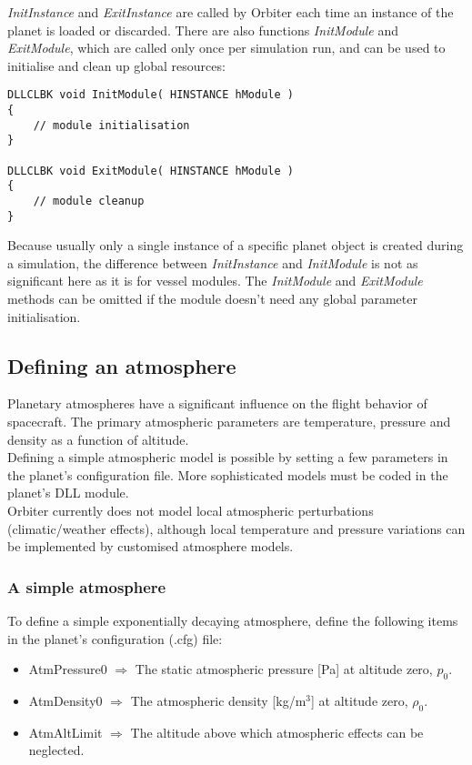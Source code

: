 \documentclass[Orbiter Developer Manual.tex]{subfiles}
\begin{document}
\noindent
\textit{InitInstance} and \textit{ExitInstance} are called by Orbiter each time an instance of the planet is loaded or discarded. There are also functions \textit{InitModule} and \textit{ExitModule}, which are called only once per simulation run, and can be used to initialise and clean up global resources:

\begin{lstlisting}
DLLCLBK void InitModule( HINSTANCE hModule )
{
	// module initialisation
}

DLLCLBK void ExitModule( HINSTANCE hModule )
{
	// module cleanup
}
\end{lstlisting}

\noindent
Because usually only a single instance of a specific planet object is created during a simulation, the difference between \textit{InitInstance} and \textit{InitModule} is not as significant here as it is for vessel modules. The \textit{InitModule} and \textit{ExitModule} methods can be omitted if the module doesn't need any global parameter initialisation.


\subsection{Defining an atmosphere}
Planetary atmospheres have a significant influence on the flight behavior of spacecraft. The primary atmospheric parameters are temperature, pressure and density as a function of altitude.\\
Defining a simple atmospheric model is possible by setting a few parameters in the planet's configuration file. More sophisticated models must be coded in the planet's DLL module.\\
Orbiter currently does not model local atmospheric perturbations (climatic/weather effects), although local temperature and pressure variations can be implemented by customised atmosphere models.


\subsubsection{A simple atmosphere}
To define a simple exponentially decaying atmosphere, define the following items in the planet's configuration (.cfg) file:

\begin{itemize}
\item AtmPressure0 $\Rightarrow$ The static atmospheric pressure [Pa] at altitude zero, $p_{0}$.
\item AtmDensity0 $\Rightarrow$ The atmospheric density [kg/m$^{3}$] at altitude zero, $\rho_{0}$.
\item AtmAltLimit $\Rightarrow$ The altitude above which atmospheric effects can be neglected.
\end{itemize}
\end{document}
